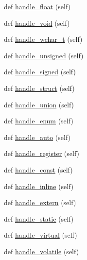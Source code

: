 \begin{DoxyCompactItemize}
\item 
def \mbox{\hyperlink{classcpp_1_1ast_1_1AstBuilder_aabe3f6d67124181a8cd2665a4562d4f6}{handle\+\_\+float}} (self)
\item 
def \mbox{\hyperlink{classcpp_1_1ast_1_1AstBuilder_a7a8f94909d4080bad2bc5dabd934057b}{handle\+\_\+void}} (self)
\item 
def \mbox{\hyperlink{classcpp_1_1ast_1_1AstBuilder_a4ec65909aea14f45709733d631aed57b}{handle\+\_\+wchar\+\_\+t}} (self)
\item 
def \mbox{\hyperlink{classcpp_1_1ast_1_1AstBuilder_a793123ea878db159de1662c10bdae897}{handle\+\_\+unsigned}} (self)
\item 
def \mbox{\hyperlink{classcpp_1_1ast_1_1AstBuilder_a61c1e82b2b4fdc337cf360e485851390}{handle\+\_\+signed}} (self)
\item 
def \mbox{\hyperlink{classcpp_1_1ast_1_1AstBuilder_aadfad5b8d50962c04504e806dc0f5b6c}{handle\+\_\+struct}} (self)
\item 
def \mbox{\hyperlink{classcpp_1_1ast_1_1AstBuilder_a9b3fbfb21c6e23f04fd596d590f93eee}{handle\+\_\+union}} (self)
\item 
def \mbox{\hyperlink{classcpp_1_1ast_1_1AstBuilder_a341a6ffabadd444a345c8c98a611774c}{handle\+\_\+enum}} (self)
\item 
def \mbox{\hyperlink{classcpp_1_1ast_1_1AstBuilder_a0cb490894f17a6c34fbe6bb8f7a2e626}{handle\+\_\+auto}} (self)
\item 
def \mbox{\hyperlink{classcpp_1_1ast_1_1AstBuilder_a890e7764fc5fd8ad2da3a62e436278a0}{handle\+\_\+register}} (self)
\item 
def \mbox{\hyperlink{classcpp_1_1ast_1_1AstBuilder_a9d24135000a6fb4a3daabb5ab8883648}{handle\+\_\+const}} (self)
\item 
def \mbox{\hyperlink{classcpp_1_1ast_1_1AstBuilder_ab2eb0c18c07584ef246a46865a17ec40}{handle\+\_\+inline}} (self)
\item 
def \mbox{\hyperlink{classcpp_1_1ast_1_1AstBuilder_a49039750d971240a270606f0608c1ff0}{handle\+\_\+extern}} (self)
\item 
def \mbox{\hyperlink{classcpp_1_1ast_1_1AstBuilder_ad98bc262537d2882adc2017023cef6aa}{handle\+\_\+static}} (self)
\item 
def \mbox{\hyperlink{classcpp_1_1ast_1_1AstBuilder_a44710dc0b8e5bdbecaa56f7c4b59c046}{handle\+\_\+virtual}} (self)
\item 
def \mbox{\hyperlink{classcpp_1_1ast_1_1AstBuilder_a2dfb23ddeb05e1017b3d1ce85a40cacb}{handle\+\_\+volatile}} (self)
\item 

\end{DoxyCompactItemize}
